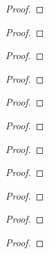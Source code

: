 \documentclass[../../main.tex]{subfiles}
\begin{document}
\begin{example}

\end{example}
\begin{proof}


\end{proof}

\begin{example}

\end{example}
\begin{proof}


\end{proof}

\begin{example}

\end{example}
\begin{proof}


\end{proof}

\begin{example}

\end{example}
\begin{proof}


\end{proof}

\begin{example}

\end{example}
\begin{proof}


\end{proof}

\begin{example}

\end{example}
\begin{proof}


\end{proof}

\begin{example}

\end{example}
\begin{proof}


\end{proof}

\begin{example}

\end{example}
\begin{proof}


\end{proof}

\begin{example}

\end{example}
\begin{proof}


\end{proof}

\begin{example}

\end{example}
\begin{proof}


\end{proof}

\begin{example}

\end{example}
\begin{proof}


\end{proof}
\end{document}

